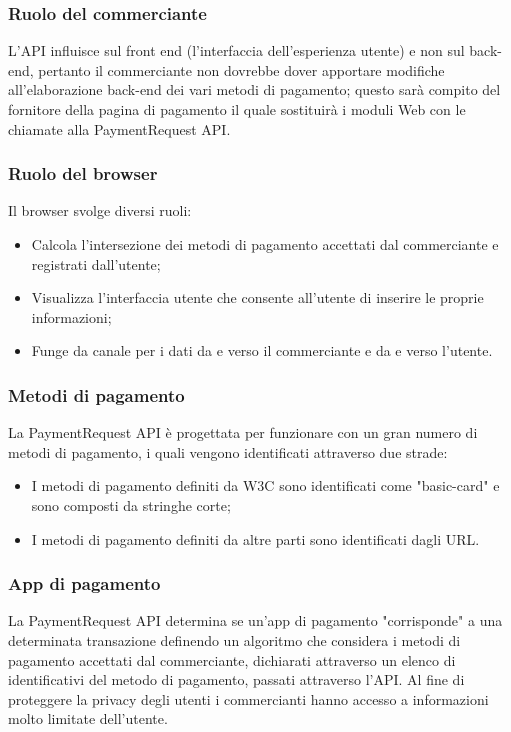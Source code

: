 \documentclass[11pt ,a4paper , twoside , openright ]{article}
\begin{document}
	\subsubsection{Ruolo del commerciante}
	L'API influisce sul front end (l'interfaccia dell'esperienza utente) e non sul back-end, pertanto il commerciante non dovrebbe dover apportare modifiche all'elaborazione back-end dei vari metodi di pagamento; questo sarà compito del fornitore della pagina di pagamento il quale sostituirà i moduli Web con le chiamate alla PaymentRequest API.
	
	\subsubsection{Ruolo del browser}
	Il browser svolge diversi ruoli:
	\begin{itemize}
	\item Calcola l'intersezione dei metodi di pagamento accettati dal commerciante e registrati dall'utente;
	\item Visualizza l'interfaccia utente che consente all'utente di inserire le proprie informazioni;
	\item Funge da canale per i dati da e verso il commerciante e da e verso l'utente.
	\end{itemize}
	
	\subsubsection{Metodi di pagamento}
	La PaymentRequest API è progettata per funzionare con un gran numero di metodi di pagamento, i quali vengono identificati attraverso due strade:
	\begin{itemize}
		\item I metodi di pagamento definiti da W3C sono identificati come "basic-card" e sono composti da stringhe corte;
		\item I metodi di pagamento definiti da altre parti sono identificati dagli URL.
	\end{itemize}
	
	\subsubsection{App di pagamento}
	La PaymentRequest API determina se un'app di pagamento "corrisponde" a una determinata transazione definendo un algoritmo che considera i metodi di pagamento accettati dal commerciante, dichiarati attraverso un elenco di identificativi del metodo di pagamento, passati attraverso l'API.
	Al fine di proteggere la privacy degli utenti i commercianti hanno accesso a informazioni molto limitate dell'utente. 
	
\end{document}
